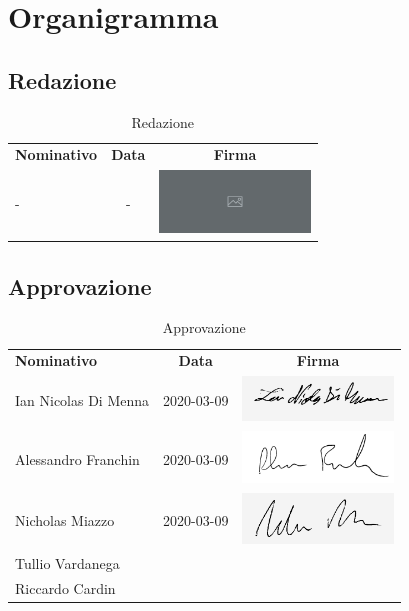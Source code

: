 \documentclass[../piano-di-progetto.tex]{subfiles}
\begin{document}
  \section{Organigramma}

  \subsection{Redazione}

  \begin{table}[H]
    \centering
    \begin{tabular}{lcc}
      \rowcolor{lightgray}

      \textbf{Nominativo}  & \textbf{Data} & \textbf{Firma}  \\
            - & - & \includegraphics[width=4cm]{img/ph.png}
    \end{tabular}
    \caption{Redazione}
  \end{table}

  \subsection{Approvazione}

  \begin{table}[H]
    \centering
    \begin{tabular}{lcc}
      \rowcolor{lightgray}
      \textbf{Nominativo}  & \textbf{Data} & \textbf{Firma}  \\
      Ian Nicolas Di Menna & 2020-03-09 & \includegraphics[width=4cm]{img/ian-g.png}     \\
      Alessandro Franchin & 2020-03-09 & \includegraphics[width=4cm]{img/ale.png}     \\
      Nicholas Miazzo & 2020-03-09 & \includegraphics[width=4cm]{img/nicholas-g.png}     \\
      Tullio Vardanega & &    \\
      Riccardo Cardin & &
    \end{tabular}
    \caption{Approvazione}
  \end{table}
\end{document}
